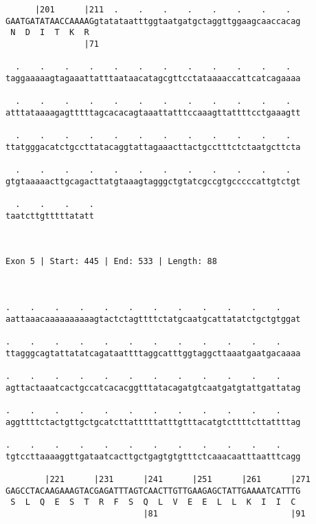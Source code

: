 \documentclass{article}
\begin{document}
\begin{Verbatim}
      |201      |211  .    .    .    .    .    .    .    .  
GAATGATATAACCAAAAGgtatataatttggtaatgatgctaggttggaagcaaccacag
 N  D  I  T  K  R                                           
                |71                                         
  
  .    .    .    .    .    .    .    .    .    .    .    .  
taggaaaaagtagaaattatttaataacatagcgttcctataaaaccattcatcagaaaa
                                                            
  .    .    .    .    .    .    .    .    .    .    .    .  
atttataaaagagtttttagcacacagtaaattatttccaaagttattttcctgaaagtt
                                                            
  .    .    .    .    .    .    .    .    .    .    .    .  
ttatgggacatctgccttatacaggtattagaaacttactgcctttctctaatgcttcta
                                                            
  .    .    .    .    .    .    .    .    .    .    .    .  
gtgtaaaaacttgcagacttatgtaaagtagggctgtatcgccgtgcccccattgtctgt
                                                            
  .    .    .    .
taatcttgtttttatatt
                  
                  
 
Exon 5 | Start: 445 | End: 533 | Length: 88



.    .    .    .    .    .    .    .    .    .    .    .    
aattaaacaaaaaaaaaagtactctagttttctatgcaatgcattatatctgctgtggat
                                                            
.    .    .    .    .    .    .    .    .    .    .    .    
ttagggcagtattatatcagataattttaggcatttggtaggcttaaatgaatgacaaaa
                                                            
.    .    .    .    .    .    .    .    .    .    .    .    
agttactaaatcactgccatcacacggtttatacagatgtcaatgatgtattgattatag
                                                            
.    .    .    .    .    .    .    .    .    .    .    .    
aggttttctactgttgctgcatcttatttttatttgtttacatgtcttttcttattttag
                                                            
.    .    .    .    .    .    .    .    .    .    .    .    
tgtccttaaaaggttgataatcacttgctgagtgtgtttctcaaacaatttaatttcagg
                                                            
        |221      |231      |241      |251      |261      |271
GAGCCTACAAGAAAGTACGAGATTTAGTCAACTTGTTGAAGAGCTATTGAAAATCATTTG
 S  L  Q  E  S  T  R  F  S  Q  L  V  E  E  L  L  K  I  I  C 
                            |81                           |91
  

\end{Verbatim}
\end{document}
